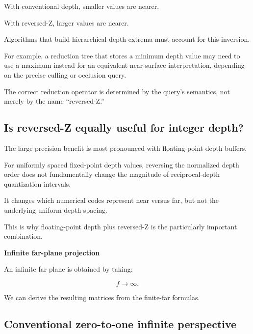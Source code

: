 \hypertarget{02-foundations-ii-ch033-hierarchical-z-interpretation}{}

With conventional depth, smaller values are nearer.

With reversed-Z, larger values are nearer.

Algorithms that build hierarchical depth extrema must account for this inversion.

For example, a reduction tree that stores a minimum depth value may need to use a maximum instead for an equivalent near-surface interpretation, depending on the precise culling or occlusion query.

The correct reduction operator is determined by the query's semantics, not merely by the name ``reversed-Z.''

\subsection{Is reversed-Z equally useful for integer depth?}\label{02-foundations-ii-ch033-is-reversed-z-equally-useful-for-integer-depth}

\hypertarget{02-foundations-ii-ch033-is-reversed-z-equally-useful-for-integer-depth}{}

The large precision benefit is most pronounced with floating-point depth buffers.

For uniformly spaced fixed-point depth values, reversing the normalized depth order does not fundamentally change the magnitude of reciprocal-depth quantization intervals.

It changes which numerical codes represent near versus far, but not the underlying uniform depth spacing.

This is why floating-point depth plus reversed-Z is the particularly important combination. 

\textbf{Infinite far-plane projection}

An infinite far plane is obtained by taking:

\[
 \boxed{f\to\infty}.
\]

We can derive the resulting matrices from the finite-far formulas.

\subsection{Conventional zero-to-one infinite perspective}\label{02-foundations-ii-ch033-conventional-zero-to-one-infinite-perspective}

\hypertarget{02-foundations-ii-ch033-conventional-zero-to-one-infinite-perspective}{}

